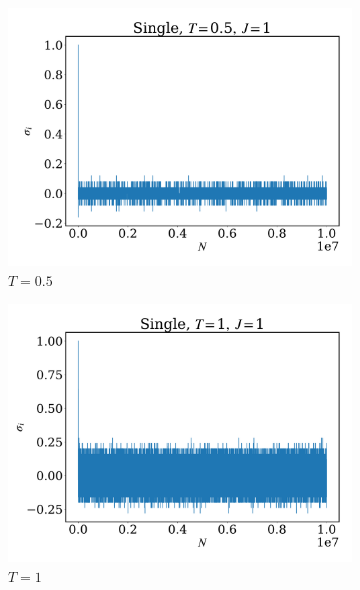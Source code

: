 \documentclass[12pt]{article}
\begin{document}
\begin{figure}
\begin{subfigure}[b]{0.49\textwidth}
		\includegraphics[width=\textwidth]{fig1DJ1N1e7/sig_s_T0.5J1.pdf}
		\caption{$T=0.5$}
	\end{subfigure}
	\begin{subfigure}[b]{0.49\textwidth}
		\centering
		\includegraphics[width=\textwidth]{fig1DJ1N1e7/sig_s_T1J1.pdf}
		\caption{$T=1$}
	\end{subfigure}
	\begin{subfigure}[b]{0.49\textwidth}
		\centering

\end{subfigure}
\end{figure}
\end{document}
